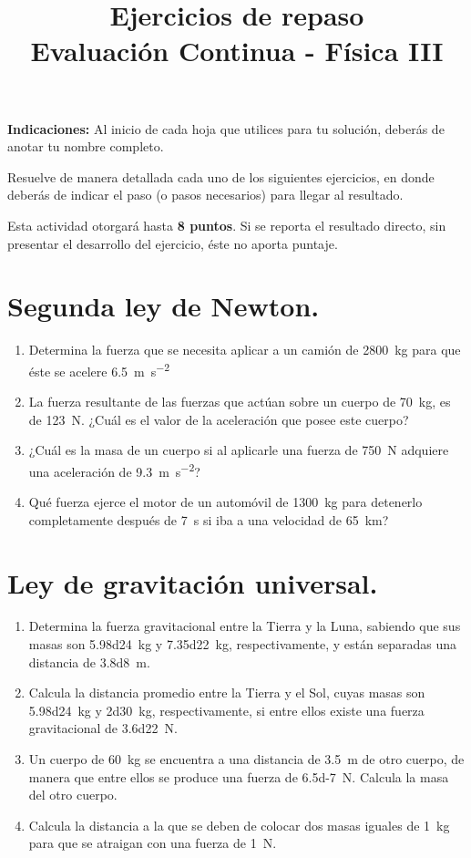 \documentclass[14pt]{extarticle}
\title{\vspace*{-2cm} Ejercicios de repaso \\  Evaluación Continua - Física III\vspace{-5ex}}
\date{}
\begin{document}
\maketitle

\textbf{Indicaciones:} Al inicio de cada hoja que utilices para tu solución, deberás de anotar tu nombre completo.
\par
Resuelve de manera detallada cada uno de los siguientes ejercicios, en donde deberás de indicar el paso (o pasos necesarios) para llegar al resultado.
\par
Esta actividad otorgará hasta \textbf{8 puntos}. Si se reporta el resultado directo, sin presentar el desarrollo del ejercicio, éste no aporta puntaje.

\section{Segunda ley de Newton.}

\begin{enumerate}
\item Determina la fuerza que se necesita aplicar a un camión de \SI{2800}{\kilo\gram} para que éste se acelere \SI{6.5}{\meter\per\square\second}
\item La fuerza resultante de las fuerzas que actúan sobre un cuerpo de \SI{70}{\kilo\gram}, es de \SI{123}{\newton}. ¿Cuál es el valor de la aceleración que posee este cuerpo?
\item ¿Cuál es la masa de un cuerpo si al aplicarle una fuerza de \SI{750}{\newton} adquiere una aceleración de \SI{9.3}{\meter\per\square\second}?
\item Qué fuerza ejerce el motor de un automóvil de \SI{1300}{\kilo\gram} para detenerlo completamente después de \SI{7}{\second} si iba a una velocidad de \SI{65}{\kilo\meter}?
\end{enumerate}

\section{Ley de gravitación universal.}

\begin{enumerate}
\item Determina la fuerza gravitacional entre la Tierra y la Luna, sabiendo que sus masas son \SI{5.98d24}{\kilo\gram} y \SI{7.35d22}{\kilo\gram}, respectivamente, y están separadas una distancia de \SI{3.8d8}{\meter}.
\item Calcula la distancia promedio entre la Tierra y el Sol, cuyas masas son \break \hfill \SI{5.98d24}{\kilo\gram} y \SI{2d30}{\kilo\gram}, respectivamente, si entre ellos existe una fuerza gravitacional de \SI{3.6d22}{\newton}.
\item Un cuerpo de \SI{60}{\kilo\gram} se encuentra a una distancia de \SI{3.5}{\meter} de otro cuerpo, de manera que entre ellos se produce una fuerza de \SI{6.5d-7}{\newton}. Calcula la masa del otro cuerpo.
\item Calcula la distancia a la que se deben de colocar dos masas iguales de \SI{1}{\kilo\gram} para que se atraigan con una fuerza de \SI{1}{\newton}.
\end{enumerate}
\end{document}
